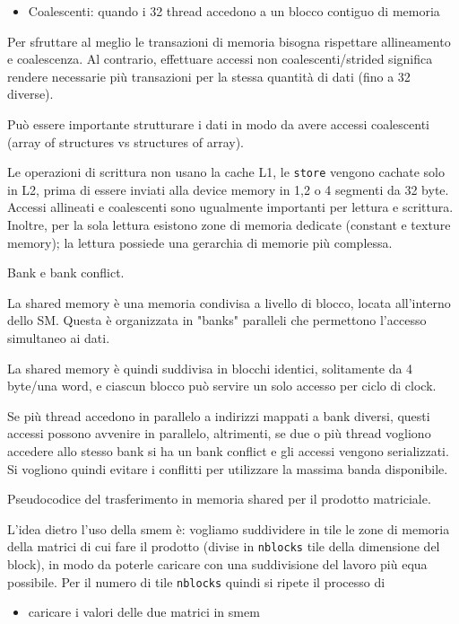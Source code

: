 \begin{questions}
\begin{solution}
\begin{itemize}
            \item Coalescenti: quando i 32 thread accedono a un blocco contiguo di memoria
        \end{itemize}
        
        Per sfruttare al meglio le transazioni di memoria bisogna rispettare allineamento e coalescenza. Al contrario, effettuare accessi non coalescenti/strided significa rendere necessarie più transazioni per la stessa quantità di dati (fino a 32 diverse).
        
        Può essere importante strutturare i dati in modo da avere accessi coalescenti (array of structures vs structures of array).
        
        Le operazioni di scrittura non usano la cache L1, le \texttt{store} vengono cachate solo in L2, prima di essere inviati alla device memory in 1,2 o 4 segmenti da 32 byte. Accessi allineati e coalescenti sono ugualmente importanti per lettura e scrittura. Inoltre, per la sola lettura esistono zone di memoria dedicate (constant e texture memory); la lettura possiede una gerarchia di memorie più complessa.
    \end{solution}
    
    \question Bank e bank conflict.
    
    \begin{solution}
        La shared memory è una memoria condivisa a livello di blocco, locata all'interno dello SM. Questa è organizzata in "banks" paralleli che permettono l'accesso simultaneo ai dati.
        
        La shared memory è quindi suddivisa in blocchi identici, solitamente da 4 byte/una word, e ciascun blocco può servire un solo accesso per ciclo di clock. 
        
        Se più thread accedono in parallelo a indirizzi mappati a bank diversi, questi accessi possono avvenire in parallelo, altrimenti, se due o più thread vogliono accedere allo stesso bank si ha un bank conflict e gli accessi vengono serializzati. Si vogliono quindi evitare i conflitti per utilizzare la massima banda disponibile.
    \end{solution}
    
    \question Pseudocodice del trasferimento in memoria shared per il prodotto matriciale.
    
    \begin{solution}
    	L'idea dietro l'uso della smem è: vogliamo suddividere in tile le zone di memoria della matrici di cui fare il prodotto (divise in \texttt{nblocks} tile della dimensione del block), in modo da poterle caricare con una suddivisione del lavoro più equa possibile. Per il numero di tile \texttt{nblocks} quindi si ripete il processo di 
    	\begin{itemize}
    		\item caricare i valori delle due matrici in smem
    		

\end{itemize}
\end{solution}
\end{questions}

